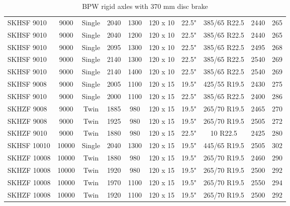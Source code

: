 \begin{table}[H]
\begin{threeparttable}
\begin{tabulary}{\textwidth}{lccccccccc}
    SKHSF 9010 & 9000  & Single & 2040  & 1300  & 120 x 10 & 22.5" & 385/65 R22.5 & 2440  & 265 \\
    SKHSF 9010 & 9000  & Single & 2040  & 1200  & 120 x 10 & 22.5" & 385/65 R22.5 & 2440  & 265 \\
    SKHSF 9010 & 9000  & Single & 2095  & 1300  & 120 x 10 & 22.5" & 385/65 R22.5 & 2495  & 268 \\
    SKHSF 9010 & 9000  & Single & 2140  & 1300  & 120 x 10 & 22.5" & 385/65 R22.5 & 2540  & 269 \\
    SKHSF 9010 & 9000  & Single & 2140  & 1400  & 120 x 10 & 22.5" & 385/65 R22.5 & 2540  & 269 \\
    SKHSF 9008 & 9000  & Single & 2005  & 1100  & 120 x 15 & 19.5" & 425/55 R19.5 & 2430  & 275 \\
    SKHSF 9010 & 9000  & Single & 2000  & 1100  & 120 x 15 & 22.5" & 385/65 R22.5 & 2400  & 286 \\
    SKHZF 9008 & 9000  & Twin  & 1885  & 980   & 120 x 15 & 19.5" & 265/70 R19.5 & 2465  & 270 \\
    SKHZF 9008 & 9000  & Twin  & 1925  & 980   & 120 x 15 & 19.5" & 265/70 R19.5 & 2505  & 272 \\
    SKHZF 9010 & 9000  & Twin  & 1880  & 980   & 120 x 15 & 22.5" & 10 R22.5 & 2425  & 280 \\
    SKHSF 10010 & 10000 & Single & 2040  & 1300  & 120 x 15 & 19.5" & 445/65 R19.5 & 2505  & 302 \\
    SKHZF 10008 & 10000 & Twin  & 1880  & 980   & 120 x 15 & 19.5" & 265/70 R19.5 & 2460  & 290 \\
    SKHZF 10008 & 10000 & Twin  & 1920  & 980   & 120 x 15 & 19.5" & 265/70 R19.5 & 2500  & 292 \\
    SKHZF 10008 & 10000 & Twin  & 1970  & 1100  & 120 x 15 & 19.5" & 265/70 R19.5 & 2550  & 294 \\
    SKHZF 10008 & 10000 & Twin  & 1920  & 1100  & 120 x 15 & 19.5" & 265/70 R19.5 & 2500  & 292 \\

	\bottomrule
	\end{tabulary}

	\caption{BPW rigid axles with 370 mm disc brake}
	\label{table:bpw-rigid-axles-with-370-mm-disc-brake}


	\end{threeparttable}
\end{table}


